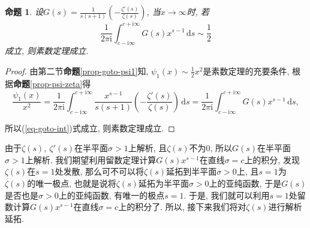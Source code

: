 \documentclass[12pt, a4paper, oneside]{ctexart}
\newtheorem{proposition}{命题}[section]
\numberwithin{equation}{section}  %
\def\d{\mathrm{d}}          %
\def\i{\mathrm{i}}          %
\begin{document}
\begin{proposition}\label{prop-goto-int}
    设$G(s) = \frac{1}{s(s+1)}\left(-\frac{\zeta'(s)}{\zeta(s)}\right)$, 当$x\to\infty$时, 若
    \begin{equation}\label{eq-goto-int}
        \frac{1}{2\pi\i}\int_{c-\i\infty}^{c+\i\infty}G(s)x^{s-1}\,\d s\sim\frac{1}{2}
    \end{equation}
    成立, 则素数定理成立.
\end{proposition}
\begin{proof}
    由第二节\textbf{命题}\ref{prop-goto-psi1}知, $\psi_1(x)\sim\frac{1}{2}x^2$是素数定理的充要条件, 根据\textbf{命题}\ref{prop-psi-zeta}得
    \begin{equation*}
        \frac{\psi_1(x)}{x^2} = \frac{1}{2\pi\i}\int_{c-\i\infty}^{c+\i\infty}\frac{x^{s-1}}{s(s+1)}\left(-\frac{\zeta'(s)}{\zeta(s)}\right)\,\d s = \frac{1}{2\pi\i}\int_{c-\i\infty}^{c+\i\infty}G(s)x^{s-1}\,\d s,
    \end{equation*}

    所以(\ref{eq-goto-int})式成立, 则素数定理成立.
\end{proof}
由于$\zeta(s),\ \zeta'(s)$在半平面$\sigma>1$上解析, 且$\zeta(s)$不为$0$, 所以$G(s)$在半平面$\sigma > 1$上解析. 我们期望利用留数定理计算$G(s)x^{s-1}$在直线$\sigma =c$上的积分, 发现$\zeta(s)$在$s=1$处发散, 那么可不可以将$\zeta(s)$延拓到半平面$\sigma > 0$上, 且$s=1$为$\zeta(s)$的唯一极点, 也就是说将$\zeta(s)$延拓为半平面$\sigma>0$上的亚纯函数, 于是$G(s)$是否也是$\sigma > 0$上的亚纯函数, 有唯一的极点$s=1$. 于是, 我们就可以利用$s=1$处留数计算$G(s)x^{s-1}$在直线$\sigma = c$上的积分了. 所以, 接下来我们将对$\zeta(s)$进行解析延拓.
\end{document}

